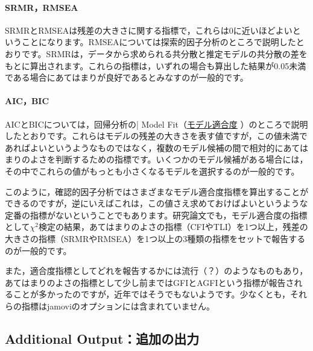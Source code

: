\documentclass[
  12pt,
  a5jpaper,
  lualatex, ja=standard]{bxjsbook}
\begin{document}
\hypertarget{srmrrmsea}{%
\paragraph*{SRMR，RMSEA}\label{srmrrmsea}}

SRMRとRMSEAは残差の大きさに関する指標で，これらは0に近いほどよいということになります。RMSEAについては探索的因子分析のところで説明したとおりです。SRMRは，データから求められる共分散と推定モデルの共分散の差をもとに算出されます。これらの指標は，いずれの場合も算出した結果が0.05未満である場合にあてはまりが良好であるとみなすのが一般的です。

\hypertarget{aicbic}{%
\paragraph*{AIC，BIC}\label{aicbic}}

AICとBICについては，回帰分析の\colorbox{bar}{\textcolor{gmoji2}{| Model Fit}}（\protect\hyperlink{sub:regression-LR-modelfit}{モデル適合度}
）のところで説明したとおりです。これらはモデルの残差の大きさを表す値ですが，この値未満であればよいというようなものではなく，複数のモデル候補の間で相対的にあてはまりのよさを判断するための指標です。いくつかのモデル候補がある場合には，その中でこれらの値がもっとも小さくなるモデルを選択するのが一般的です。

このように，確認的因子分析ではさまざまなモデル適合度指標を算出することができるのですが，逆にいえばこれは，この値さえ求めておけばよいというような定番の指標がないということでもあります。研究論文でも，モデル適合度の指標として\(\chi^2\)検定の結果，あてはまりのよさの指標（CFIやTLI）を1つ以上，残差の大きさの指標（SRMRやRMSEA）を1つ以上の3種類の指標をセットで報告するのが一般的です。

また，適合度指標としてどれを報告するかには流行（？）のようなものもあり，あてはまりのよさの指標として少し前まではGFIとAGFIという指標が報告されることが多かったのですが，近年ではそうでもないようです。少なくとも，それらの指標はjamoviのオプションには含まれていません。

\hypertarget{sub:factor-cfa-additional-output}{%
\subsection{Additional Output：追加の出力}\label{sub:factor-cfa-additional-output}}
\end{document}
